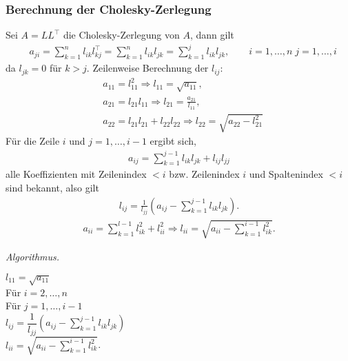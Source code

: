 \subsubsection{Berechnung der Cholesky-Zerlegung}
Sei $A=LL^\top$ die Cholesky-Zerlegung von $A$, dann gilt
\begin{align*}
&a_{ji} = \sum\limits_{k=1}^n l_{ik}l_{kj}^\top = \sum\limits_{k=1}^n
l_{ik}l_{jk} = \sum\limits_{k=1}^jl_{ik}l_{jk},\qquad i=1,\ldots,n\;
j=1,\ldots,i
\end{align*}
da $l_{jk}=0$ für $k>j$. Zeilenweise Berechnung der $l_{ij}$:
\begin{align*}
&a_{11} = l_{11}^2 \Rightarrow l_{11} = \sqrt{a_{11}},\\
&a_{21} = l_{21}l_{11} \Rightarrow l_{21} = \frac{a_{21}}{l_{11}},\\
&a_{22} = l_{21}l_{21} + l_{22}l_{22} \Rightarrow l_{22} =
\sqrt{a_{22}-l_{21}^2}
\end{align*}
Für die Zeile $i$ und $j=1,\ldots,i-1$ ergibt sich,
\begin{align*}
a_{ij} = \sum\limits_{k=1}^{j-1}l_{ik}l_{jk} + l_{ij}l_{jj}
\end{align*}
alle Koeffizienten mit Zeilenindex $<i$ bzw. Zeilenindex $i$ und Spaltenindex
$<i$ sind bekannt, also gilt
\begin{align*}
l_{ij} = \frac{1}{l_{jj}}\left(a_{ij}-\sum\limits_{k=1}^{j-1}
l_{ik}l_{jk}\right).
\end{align*}
\begin{align*}
a_{ii} = \sum\limits_{k=1}^{l-1} l_{ik}^2 + l_{ii}^2
\Rightarrow l_{ii} = \sqrt{a_{ii}- \sum\limits_{k=1}^{i-1}l_{ik}^2}.
\end{align*}

\textit{Algorithmus.}

\begin{tabbing}
\hspace{20pt}	$l_{11} = \sqrt{a_{11}}$\\
\hspace{20pt}	Für $i=2,\ldots,n$\\
\hspace{40pt}		Für $j=1,\ldots,i-1$\\
\hspace{60pt}			$l_{ij} = \dfrac{1}{l_{jj}}\left(a_{ij}-\sum\limits_{k=1}^{j-1}
l_{ik}l_{jk}\right)$\\
\hspace{40pt}		$l_{ii} = \sqrt{a_{ii}- \sum\limits_{k=1}^{i-1}l_{ik}^2}$.
\end{tabbing}

